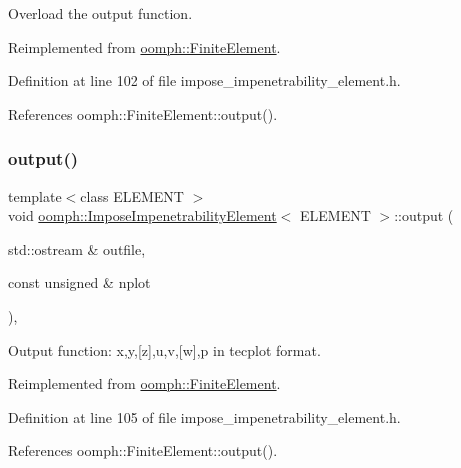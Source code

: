 Overload the output function. 



Reimplemented from \hyperlink{classoomph_1_1FiniteElement_a2ad98a3d2ef4999f1bef62c0ff13f2a7}{oomph\+::\+Finite\+Element}.



Definition at line 102 of file impose\+\_\+impenetrability\+\_\+element.\+h.



References oomph\+::\+Finite\+Element\+::output().

\mbox{\label{classoomph_1_1ImposeImpenetrabilityElement_ad23ac5158f42b7a6c65ec7cbd3deac44}} 
\subsubsection{\texorpdfstring{output()}{output()}\hspace{0.1cm}{\footnotesize\ttfamily [2/2]}}
{\footnotesize\ttfamily template$<$class E\+L\+E\+M\+E\+NT $>$ \\
void \hyperlink{classoomph_1_1ImposeImpenetrabilityElement}{oomph\+::\+Impose\+Impenetrability\+Element}$<$ E\+L\+E\+M\+E\+NT $>$\+::output (\begin{DoxyParamCaption}\item[{std\+::ostream \&}]{outfile,  }\item[{const unsigned \&}]{nplot }\end{DoxyParamCaption})\hspace{0.3cm}{\ttfamily [inline]}, {\ttfamily [virtual]}}



Output function\+: x,y,\mbox{[}z\mbox{]},u,v,\mbox{[}w\mbox{]},p in tecplot format. 



Reimplemented from \hyperlink{classoomph_1_1FiniteElement_afa9d9b2670f999b43e6679c9dd28c457}{oomph\+::\+Finite\+Element}.



Definition at line 105 of file impose\+\_\+impenetrability\+\_\+element.\+h.



References oomph\+::\+Finite\+Element\+::output().


